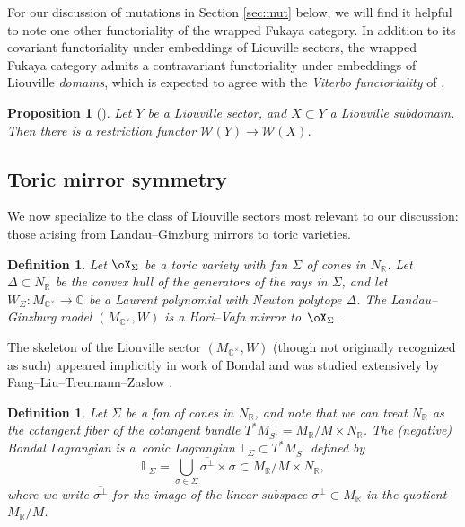 \documentclass[pdftex]{sigma}%
\numberwithin{equation}{section}
\newtheorem{Proposition}[Theorem]{Proposition}
\newtheorem{Definition}[Theorem]{Definition}
\def\CC{\mathbb{C}}
\def\LL{\mathbb{L}}
\def\RR{\mathbb{R}}
\def\cW{\mathcal{W}}
\begin{document}
For our discussion of mutations in Section \ref{sec:mut} below, we will find it helpful to note one other functoriality of the wrapped Fukaya category. In addition to its covariant functoriality under embeddings of Liouville sectors, the wrapped Fukaya category admits a contravariant functoriality under embeddings of Liouville {\em domains}, which is expected to agree with the {\em Viterbo functoriality} of \cite{AS-viterbo}.

\begin{Proposition}[{\cite[Section 8.3]{GPS2}}]\label{prop:viterbo}
 Let $Y$ be a Liouville sector, and $X\subset Y$ a Liouville subdomain. Then there is a restriction functor $\cW(Y)\to\cW(X)$.
\end{Proposition}

\subsection{Toric mirror symmetry}
We now specialize to the class of Liouville sectors most relevant to our discussion: those arising from Landau--Ginzburg mirrors to toric varieties.
\begin{Definition}
 Let $\oX_\Sigma$ be a toric variety with fan $\Sigma$ of cones in $N_\RR$. Let $\Delta\subset N_\RR$ be the convex hull of the generators of the rays in $\Sigma$, and let $W_\Sigma\colon M_{\CC^\times}\to \CC$ be a Laurent polynomial with Newton polytope $\Delta$. The Landau--Ginzburg model $(M_{\CC^\times},W)$ is a {\em Hori--Vafa mirror} to~$\oX_\Sigma$.
\end{Definition}

The skeleton of the Liouville sector $(M_{\CC^\times},W)$ (though not originally recognized as such) appeared implicitly in work of Bondal \cite{Bo-ccc} and was studied extensively by Fang--Liu--Treumann--Zaslow \cite{FLTZ2,FLTZ1,FLTZ3}.

\begin{Definition}\label{defn:bondal-lag}
 Let $\Sigma$ be a fan of cones in $N_\RR$, and note that we can treat $N_\RR$ as the cotangent fiber of the cotangent bundle $T^*M_{S^1} = M_\RR/M\times N_\RR$.
 The (negative) {\em Bondal Lagrangian} is a~conic Lagrangian $\LL_\Sigma\subset T^*M_{S^1}$ defined by
 \begin{equation}\label{eq:bondal-lag}
 \LL_\Sigma = \bigcup_{\sigma \in \Sigma}\overline{\sigma^\perp}\times \sigma\subset M_\RR/M\times N_\RR,
\end{equation}
where we write $\overline{\sigma^\perp}$ for the image of the linear subspace $\sigma^\perp\subset M_\RR$ in the quotient $M_\RR/M$.
\end{Definition}
\end{document}

